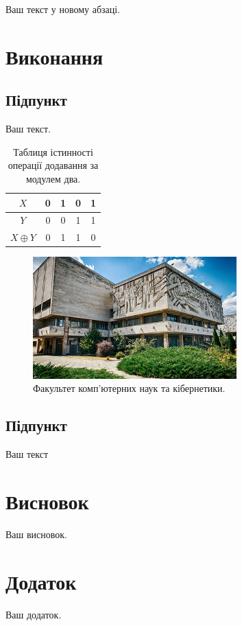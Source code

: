 \documentclass[12pt]{extreport}
\begin{document}
\noindent %
Ваш текст у новому абзаці.

\section*{Виконання}
\subsection*{Підпункт}
Ваш текст.

\begin{table}[h]
    \large
    \centering
    \begin{tabular}{|c|c|c|c|c|}
    \hline
    $X$ & 0 & 1 & 0 & 1\\
    \hline
    $Y$ & 0 & 0 & 1 & 1\\
    \hline
    $X\oplus Y$ & 0 & 1 & 1 & 0\\
    \hline
    \end{tabular}
    \caption{\label{tab:widgets}Таблиця істинності операції додавання за модулем два.}
\end{table}

\begin{figure}[h]
    \centering
    \includegraphics[width=0.7\textwidth]{fcsc.jpg}
    \caption{\label{fig:fcsc}Факультет комп'ютерних наук та кібернетики.}
\end{figure}

\subsection*{Підпункт}
Ваш текст

\section*{Висновок}
Ваш висновок.

\pagebreak
{}
\section*{Додаток}
Ваш додаток.
\end{document}

